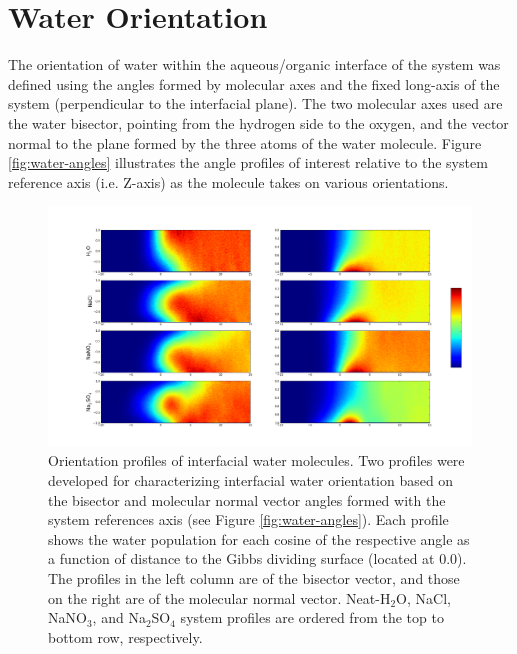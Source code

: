 \section{Water Orientation}
The orientation of water within the aqueous/organic interface of the system was defined using the angles formed by molecular axes and the fixed long-axis of the system (perpendicular to the interfacial plane). The two molecular axes used are the water bisector, pointing from the hydrogen side to the oxygen, and the vector normal to the plane formed by the three atoms of the water molecule. Figure \ref{fig:water-angles} illustrates the angle profiles of interest relative to the system reference axis (i.e. Z-axis) as the molecule takes on various orientations.


\begin{figure}[h!]
\begin{center}
	\includegraphics[scale=0.26]{images/h2o-2dhistograms.png}
	\caption{Orientation profiles of interfacial water molecules. Two profiles were developed for characterizing interfacial water orientation based on the bisector and molecular normal vector angles formed with the system references axis (see Figure \ref{fig:water-angles}). Each profile shows the water population for each cosine of the respective angle as a function of distance to the Gibbs dividing surface (located at 0.0). The profiles in the left column are of the bisector vector, and those on the right are of the molecular normal vector. Neat-H$_2$O, NaCl, NaNO$_3$, and Na$_2$SO$_4$ system profiles are ordered from the top to bottom row, respectively.}
	\label{fig:system-orientations}
\end{center}
\end{figure}

